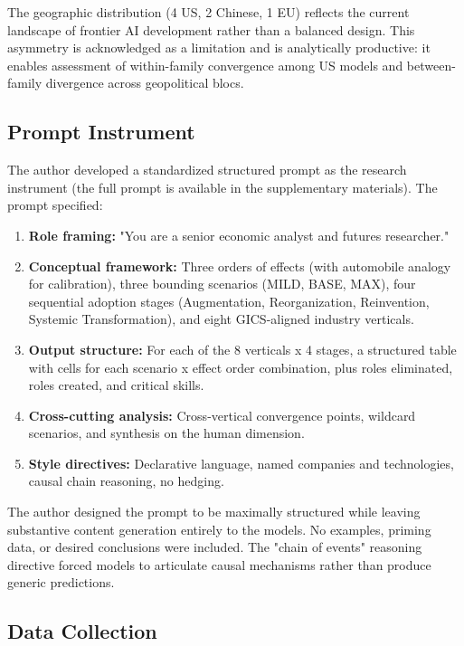 \documentclass[preprint,review,12pt]{elsarticle}
\begin{document}
The geographic distribution (4 US, 2 Chinese, 1 EU) reflects the current landscape of frontier AI development rather than a balanced design. This asymmetry is acknowledged as a limitation and is analytically productive: it enables assessment of within-family convergence among US models and between-family divergence across geopolitical blocs.


\subsection{Prompt Instrument}
\label{sec:prompt_instrument}

The author developed a standardized structured prompt as the research instrument (the full prompt is available in the supplementary materials). The prompt specified:

\begin{enumerate}
  \item \textbf{Role framing:} "You are a senior economic analyst and futures researcher."
  \item \textbf{Conceptual framework:} Three orders of effects (with automobile analogy for calibration), three bounding scenarios (MILD, BASE, MAX), four sequential adoption stages (Augmentation, Reorganization, Reinvention, Systemic Transformation), and eight GICS-aligned industry verticals.
  \item \textbf{Output structure:} For each of the 8 verticals x 4 stages, a structured table with cells for each scenario x effect order combination, plus roles eliminated, roles created, and critical skills.
  \item \textbf{Cross-cutting analysis:} Cross-vertical convergence points, wildcard scenarios, and synthesis on the human dimension.
  \item \textbf{Style directives:} Declarative language, named companies and technologies, causal chain reasoning, no hedging.

\end{enumerate}
The author designed the prompt to be maximally structured while leaving substantive content generation entirely to the models. No examples, priming data, or desired conclusions were included. The "chain of events" reasoning directive forced models to articulate causal mechanisms rather than produce generic predictions.


\subsection{Data Collection}
\label{sec:data_collection}
\end{document}
